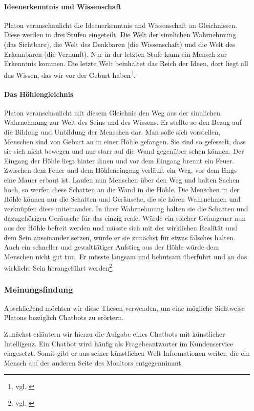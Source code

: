 \paragraph{Ideenerkenntnis und Wissenschaft}
Platon veranschaulicht die Ideenerkenntnis und Wissenschaft an Gleichnissen. Diese werden in drei Stufen eingeteilt. Die Welt der sinnlichen Wahrnehmung (das Sichtbare), die Welt des Denkbaren (die Wissenschaft) und die Welt des Erkennbaren (die Vernunft). Nur in der letzten Stufe kann ein Mensch zur Erkenntnis kommen. Die letzte Welt beinhaltet das Reich der Ideen, dort liegt all das Wissen, das wir vor der Geburt haben\footnote{vgl. \cite{Platon6} \cite{Platon4}}.

\paragraph{Das Höhlengleichnis}
Platon veranschaulicht mit diesem Gleichnis den Weg aus der sinnlichen Wahrnehmung zur Welt des Seins und des Wissens. Er stellte so den Bezug auf die Bildung und Unbildung der Menschen dar.
Man solle sich vorstellen,  Menschen sind von Geburt an in einer Höhle gefangen. Sie sind so gefesselt, dass sie sich nicht bewegen und nur starr auf die Wand gegenüber sehen können. Der Eingang der Höhle liegt hinter ihnen und vor dem Eingang brennt ein Feuer. Zwischen dem Feuer und dem Höhleneingang verläuft ein Weg, vor dem längs eine Mauer erbaut ist. Laufen nun Menschen über den Weg und halten Sachen hoch, so werfen diese Schatten an die Wand in die Höhle. Die Menschen in der Höhle können nur die Schatten und Geräusche, die sie hören Wahrnehmen und verknüpfen diese miteinander. In ihrer Wahrnehmung halten sie die Schatten und dazugehörigen Geräusche für das einzig reale. Würde ein solcher Gefangener nun aus der Höhle befreit werden und müsste sich mit der wirklichen Realität und dem Sein auseinander setzen, würde er sie zunächst für etwas falsches halten. Auch ein schneller und gewalttätiger Aufstieg aus der Höhle würde dem Menschen nicht gut tun. Er müsste langsam und behutsam überführt und an das wirkliche Sein herangeführt werden\footnote{vgl. \cite{Politeia} }.    
	
\subsubsection{Meinungsfindung}
Abschließend möchten wir diese Thesen verwenden, um eine mögliche Sichtweise Platons bezüglich Chatbots zu erörtern.

Zunächst erläutern wir hierzu die Aufgabe eines Chatbots mit künstlicher Intelligenz. Ein Chatbot wird häufig als Fragebeantworter im Kundenservice eingesetzt. Somit gibt er aus seiner künstlichen Welt Informationen weiter, die ein Mensch auf der anderen Seite des Monitors entgegennimmt.

